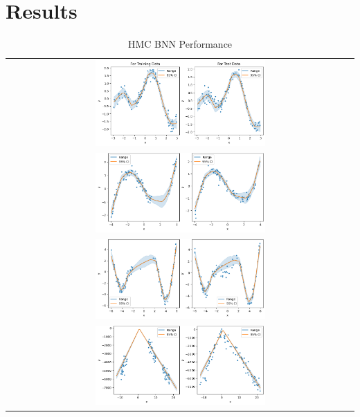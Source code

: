 \documentclass[conference]{IEEEtran}
\begin{document}
\section{Results}

\begin{table}[H]
\centering
\begin{tabular}{c}
\includegraphics[width=0.5\textwidth]{images/hmc_bnn--problem_A--sb.png}\\
\includegraphics[width=0.5\textwidth]{images/hmc_bnn--problem_B--sb.png}\\
\includegraphics[width=0.5\textwidth]{images/hmc_bnn--problem_C--sb.png}\\
\includegraphics[width=0.5\textwidth]{images/hmc_bnn--problem_D--sb.png}\\
\end{tabular}
\caption{HMC BNN Performance}
\label{tbl:table_of_figures}
\end{table}
\end{document}
